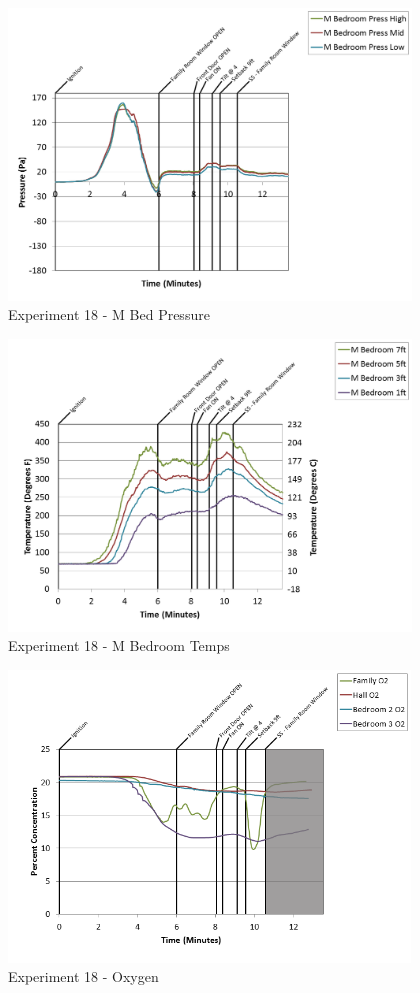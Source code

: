 \documentclass{article}
\begin{document}
\begin{appendices}
\begin{figure}[h!]
	\centering
	\includegraphics[height=3.05in]{0_Images/Results_Charts/Exp_18_Charts/MBedPressure.png}
	\caption{Experiment 18 - M Bed Pressure}
\end{figure}

\clearpage

\begin{figure}[h!]
	\centering
	\includegraphics[height=3.05in]{0_Images/Results_Charts/Exp_18_Charts/MBedroomTemps.png}
	\caption{Experiment 18 - M Bedroom Temps}
\end{figure}


\begin{figure}[h!]
	\centering
	\includegraphics[height=3.05in]{0_Images/Results_Charts/Exp_18_Charts/Oxygen.png}
	\caption{Experiment 18 - Oxygen}
\end{figure}


\end{appendices}
\end{document}
